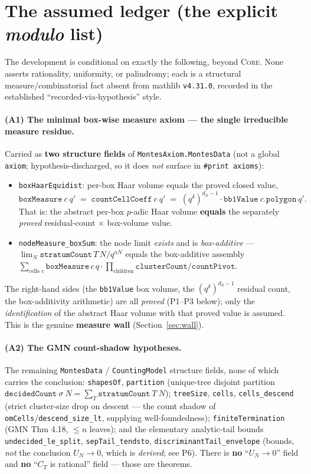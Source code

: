 \documentclass[11pt]{article}
\newcommand{\code}[1]{\texttt{#1}}
\newcommand{\modulo}{\textsl{modulo}}
\newcommand{\Core}{\textsc{Core}}
\begin{document}
\section{The assumed ledger (the explicit \modulo{} list)}\label{sec:axioms}

The development is conditional on exactly the following, beyond \Core. None asserts
rationality, uniformity, or palindromy; each is a structural measure/combinatorial fact
absent from \textsf{mathlib} \code{v4.31.0}, recorded in the established
``recorded-via-hypothesis'' style.

\paragraph{(A1) The minimal box-wise measure axiom --- the single irreducible measure
residue.} Carried as \textbf{two structure fields} of \code{MontesAxiom.MontesData} (not
a global \code{axiom}; hypothesis-discharged, so it does \emph{not} surface in
\code{\#print axioms}):
\begin{itemize}[leftmargin=1.4em]
\item \code{boxHaarEquidist}: per-box Haar volume equals the proved closed value,
\[
  \code{boxMeasure}\ c\ q' \;=\; \code{countCellCoeff}\ c\ q'
  \;=\; (q^{\delta})^{d_S-1}\cdot\code{bb1Value}\ c.\code{polygon}\ q' .
\]
That is: the abstract per-box $p$-adic Haar volume \textbf{equals} the separately
\emph{proved} residual-count $\times$ box-volume value.
\item \code{nodeMeasure\_boxSum}: the node limit \emph{exists} and is \emph{box-additive}
--- $\lim_N \code{stratumCount}\,T\,N / q^{nN}$ equals the box-additive assembly
$\sum_{\text{cells }c}\code{boxMeasure}\,c\,q\cdot\prod_{\text{children}}\code{clusterCount}/\code{countPivot}$.
\end{itemize}
The right-hand sides (the \code{bb1Value} box volume, the $(q^{\delta})^{d_S-1}$ residual
count, the box-additivity arithmetic) are all \emph{proved} (P1--P3 below); only the
\emph{identification} of the abstract Haar volume with that proved value is assumed. This
is the genuine \textbf{measure wall} (Section~\ref{sec:wall}).

\paragraph{(A2) The GMN count-shadow hypotheses.} The remaining \code{MontesData} /
\code{CountingModel} structure fields, none of which carries the conclusion:
\code{shapesOf}, \code{partition} (unique-tree disjoint partition
$\code{decidedCount}\ \sigma\ N=\sum_T\code{stratumCount}\ T\ N$); \code{treeSize},
\code{cells}, \code{cells\_descend} (strict cluster-size drop on descent --- the count
shadow of \code{omCells}/\code{descend\_size\_lt}, supplying well-foundedness);
\code{finiteTermination} (GMN Thm 4.18, $\le n$ leaves); and the elementary analytic-tail
bounds \code{undecided\_le\_split}, \code{sepTail\_tendsto},
\code{discriminantTail\_envelope} (bounds, \emph{not} the conclusion $U_N\to 0$, which is
\emph{derived}; see P6). There is \textbf{no} ``$U_N\to0$'' field and \textbf{no} ``$C_T$
is rational'' field --- those are theorems.
\end{document}
